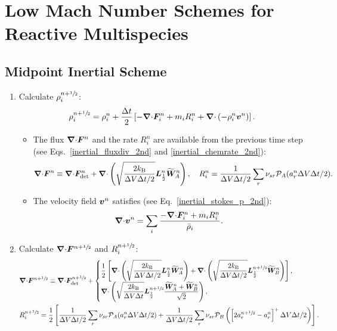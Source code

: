 \documentclass[
10pt
showpacs, showkeys,
amsmath,amssymb,
aps,
pre,
floatfix,
]{revtex4-1}
\newcommand{\divg}{{\V\nabla\cdot}}                       %
\begin{document}
\section*{Low Mach Number Schemes for Reactive Multispecies}



\subsection{Midpoint Inertial Scheme}

\begin{enumerate}

\item Calculate $\rho^{n+\sfrac{1}{2}}_i$:
\begin{equation}
\rho^{n+\myhalf}_i = \rho^n_i + \frac{\D{t}}{2} \left[ -\divg\V{F}^n_i + m_i R^n_i + \divg\left( -\rho^n_i \V{v}^n \right) \right].
\end{equation}
\begin{itemize}
\item The flux $\divg\V{F}^n$ and the rate $R^n_i$ are available from the previous time step (see Eqs.~\eqref{inertial_fluxdiv_2nd} and \eqref{inertial_chemrate_2nd}):
\begin{equation}
\divg\V{F}^n \equiv \divg\V{F}^n_\mathrm{det} + \divg\left( \sqrt{ \frac{2k_\mathrm{B}}{\D{V}\D{t}/2} } \V{L}^n_{\frac12} \widetilde{\V{W}}^n_A \right),
\quad R^n_i = \frac{1}{\D{V}\D{t}/2} \sum_r \nu_{sr} \mathcal{P}_A(a^n_r\D{V}\D{t}/2).
\end{equation}
\item The velocity field $\boldsymbol{v}^n$ satisfies (see Eq.~\eqref{inertial_stokes_p_2nd}):
\begin{equation}
\divg\V{v}^n = \sum_i \frac{ -\divg\V{F}^n_i + m_i R^n_i }{\bar{\rho}_i}.
\end{equation}
\end{itemize}

\item Calculate $\divg\V{F}^{n+\myhalf}$ and $R^{n+\sfrac{1}{2}}_i$:
\begin{align}
&\divg\V{F}^{n+\myhalf} \equiv \divg\V{F}_\mathrm{det}^{n+\myhalf} +
\begin{cases} 
\displaystyle
\frac{1}{2}\left[ 
\divg\left( \sqrt{ \frac{2k_\mathrm{B}}{\D{V}\D{t}/2} } \V{L}^n_{\frac12} \widetilde{\V{W}}^n_A \right) 
+\divg\left( \sqrt{ \frac{2k_\mathrm{B}}{\D{V}\D{t}/2} } \V{L}^{n+\myhalf}_{\frac12} \widetilde{\V{W}}^n_B \right) 
\right], \\
\displaystyle
\divg\left( \sqrt{ \frac{2k_\mathrm{B}}{\D{V}\D{t}} } \V{L}^{n+\myhalf}_{\frac12} \frac{\widetilde{\V{W}}^n_A+\widetilde{\V{W}}^n_B}{\sqrt{2}} \right),
\end{cases}
\\
&R^{n+\myhalf}_i = \frac{1}{2}\left[ \frac{1}{\D{V}\D{t}/2} \sum_r \nu_{sr} \mathcal{P}_A(a^n_r\D{V}\D{t}/2) + \frac{1}{\D{V}\D{t}/2} \sum_r \nu_{sr} \mathcal{P}_B\left( \left[ 2 a^{n+\myhalf}_r - a^n_r \right]^+ \D{V}\D{t}/2 \right) \right].
\end{align}


\end{enumerate}
\end{document}
